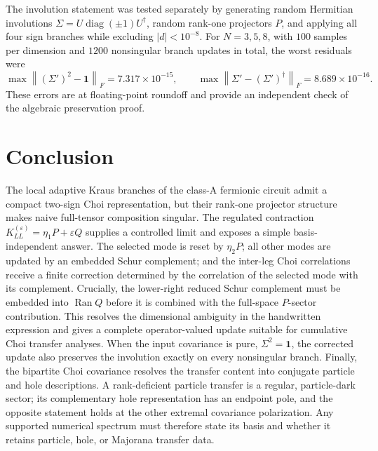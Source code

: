 \documentclass[aps,prb,onecolumn,nofootinbib,superscriptaddress]{revtex4-2}
\newcommand{\I}{\mathbf{1}}
\newcommand{\Ran}{\operatorname{Ran}}
\newcommand{\eps}{\varepsilon}
\theoremstyle{plain}
\theoremstyle{definition}
\begin{document}
The involution statement was tested separately by generating random
Hermitian involutions \(\Sigma=U\operatorname{diag}(\pm1)U^\dagger\), random rank-one
projectors \(P\), and applying all four sign branches while excluding
\(\lvert d\rvert<10^{-8}\).  For \(N=3,5,8\), with \(100\) samples per dimension
and \(1200\) nonsingular branch updates in total, the worst residuals were
\begin{equation}
  \max \left\lVert\left(\Sigma'\right)^2-\I\right\rVert_{F}
  =
  7.317\times10^{-15},
  \qquad
  \max \left\lVert\Sigma'-\left(\Sigma'\right)^\dagger\right\rVert_{F}
  =
  8.689\times10^{-16}.
\end{equation}
These errors are at floating-point roundoff and provide an independent
check of the algebraic preservation proof.

\section{Conclusion}

The local adaptive Kraus branches of the class-A fermionic circuit admit a
compact two-sign Choi representation, but their rank-one projector structure
makes naive full-tensor composition singular.  The regulated contraction
\(K_{LL}^{(\eps)}=\eta_1P+\eps Q\) supplies a controlled limit and exposes a
simple basis-independent answer.  The selected mode is reset by
\(\eta_2P\); all other modes are updated by an embedded Schur complement; and
the inter-leg Choi correlations receive a finite correction determined by the
correlation of the selected mode with its complement.  Crucially, the
lower-right reduced Schur complement must be embedded into \(\Ran Q\) before
it is combined with the full-space \(P\)-sector contribution.  This resolves
the dimensional ambiguity in the handwritten expression and gives a complete
operator-valued update suitable for cumulative Choi transfer analyses.
When the input covariance is pure, \(\Sigma^2=\I\), the corrected update
also preserves the involution exactly on every nonsingular branch.  Finally,
the bipartite Choi covariance resolves the transfer content into conjugate
particle and hole descriptions.  A rank-deficient particle transfer is a
regular, particle-dark sector; its complementary hole representation has an
endpoint pole, and the opposite statement holds at the other extremal
covariance polarization.  Any supported numerical spectrum must therefore
state its basis and whether it retains particle, hole, or Majorana transfer
data.
\end{document}
